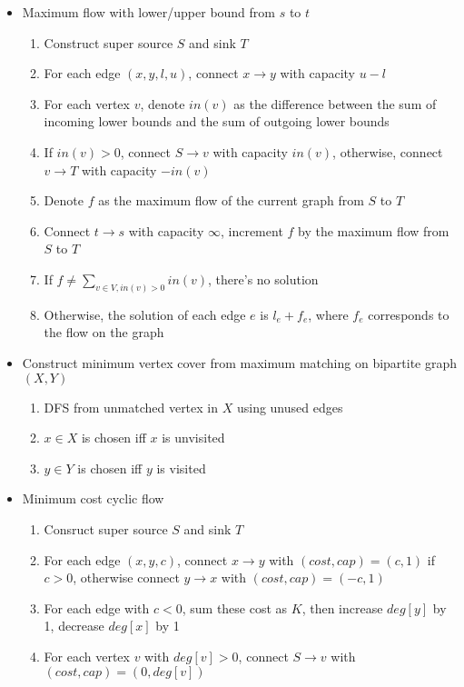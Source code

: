 \normalsize
\begin{itemize}
    \item Maximum flow with lower/upper bound from $s$ to $t$
    \begin{enumerate}
        \item Construct super source $S$ and sink $T$
        \item For each edge $(x, y, l, u)$, connect $x \rightarrow y$ with capacity $u - l$
        \item For each vertex $v$, denote $in(v)$ as the difference between the sum of incoming lower bounds and the sum of outgoing lower bounds
        \item If $in(v) > 0$, connect $S \rightarrow v$ with capacity $in(v)$, otherwise, connect $v \rightarrow T$ with capacity $-in(v)$
        \item Denote $f$ as the maximum flow of the current graph from $S$ to $T$
        \item Connect $t \rightarrow s$ with capacity $\infty$, increment $f$ by the maximum flow from $S$ to $T$
        \item If $f \neq \sum_{v \in V, in(v) > 0}{in(v)}$, there's no solution
        \item Otherwise, the solution of each edge $e$ is $l_e + f_e$, where $f_e$ corresponds to the flow on the graph
    \end{enumerate}
    \item Construct minimum vertex cover from maximum matching on bipartite graph $(X, Y)$
    \begin{enumerate}
        \item DFS from unmatched vertex in $X$ using unused edges
        \item $x \in X$ is chosen iff $x$ is unvisited
        \item $y \in Y$ is chosen iff $y$ is visited
    \end{enumerate}
    \item Minimum cost cyclic flow
    \begin{enumerate}
        \item Consruct super source $S$ and sink $T$
        \item For each edge $(x, y, c)$, connect $x \rightarrow y$ with $(cost, cap) = (c, 1)$ if $c > 0$, otherwise connect $y \rightarrow x$ with $(cost, cap) = (-c, 1)$
        \item For each edge with $c < 0$, sum these cost as $K$, then increase $deg[y]$ by 1, decrease $deg[x]$ by 1
        \item For each vertex $v$ with $deg[v] > 0$, connect $S \rightarrow v$ with $(cost, cap) = (0, deg[v])$

\end{enumerate}
\end{itemize}
